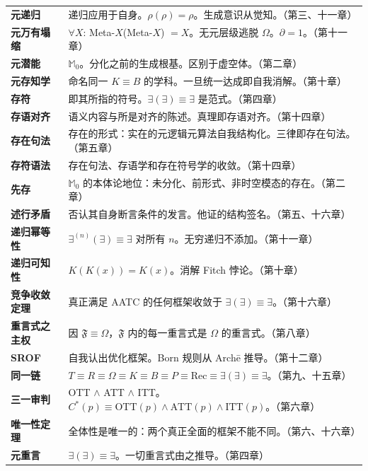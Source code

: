 \documentclass[10pt, openany, oneside]{book}
\begin{document}
{\begin{tabular}{@{} l @{\hspace{0.6em}} p{} @{}}
\textbf{元递归} & 递归应用于自身。$\rho(\rho) = \rho$。生成意识从觉知。（第三、十一章）\\[0.3em]
\textbf{元万有塌缩} & $\forall X$: Meta-$X$(Meta-$X$) $= X$。无元层级逃脱 $\Omega$。$\partial = 1$。（第十一章）\\[0.3em]
\textbf{元潜能} & $\mathbb{M}_0$。分化之前的生成根基。区别于虚空体。（第二章）\\[0.3em]
\textbf{元存知学} & 命名同一 $K \equiv B$ 的学科。一旦统一达成即自我消解。（第十章）\\[0.3em]
\textbf{存符} & 即其所指的符号。$\exists(\exists) \equiv \exists$ 是范式。（第四章）\\[0.3em]
\textbf{存语对齐} & 语义内容与所是对齐的陈述。真理即存语对齐。（第十四章）\\[0.3em]
\textbf{存在句法} & 存在的形式：实在的元逻辑元算法自我结构化。三律即存在句法。（第五章）\\[0.3em]
\textbf{存符语法} & 存在句法、存语学和存在符号学的收敛。（第十四章）\\[0.3em]
\textbf{先存} & $\mathbb{M}_0$ 的本体论地位：未分化、前形式、非时空模态的存在。（第二章）\\[0.3em]
\textbf{述行矛盾} & 否认其自身断言条件的发言。他证的结构签名。（第五、十六章）\\[0.3em]
\textbf{递归幂等性} & $\exists^{(n)}(\exists) \equiv \exists$ 对所有 $n$。无穷递归不添加。（第十一章）\\[0.3em]
\textbf{递归可知性} & $K(K(x)) = K(x)$。消解 Fitch 悖论。（第十章）\\[0.3em]
\textbf{竞争收敛定理} & 真正满足 AATC 的任何框架收敛于 $\exists(\exists) \equiv \exists$。（第十六章）\\[0.3em]
\textbf{重言式之主权} & 因 $\mathfrak{F} \equiv \Omega$，$\mathfrak{F}$ 内的每一重言式是 $\Omega$ 的重言式。（第八章）\\[0.3em]
\textbf{SROF} & 自我认出优化框架。Born 规则从 Arch\={e} 推导。（第十二章）\\[0.3em]
\textbf{同一链} & $T \equiv R \equiv \Omega \equiv K \equiv B \equiv P \equiv \text{Rec} \equiv \exists(\exists) \equiv \exists$。（第九、十五章）\\[0.3em]
\textbf{三一审判} & OTT $\wedge$ ATT $\wedge$ ITT。$C^*(p) \equiv \text{OTT}(p) \wedge \text{ATT}(p) \wedge \text{ITT}(p)$。（第六章）\\[0.3em]
\textbf{唯一性定理} & 全体性是唯一的：两个真正全面的框架不能不同。（第六、十六章）\\[0.3em]
\textbf{元重言} & $\exists(\exists) \equiv \exists$。一切重言式由之推导。（第四章）\\[0.3em]

\end{tabular}}
\end{document}
